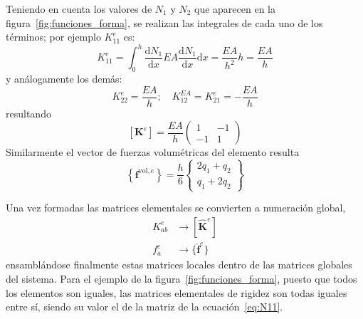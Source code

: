 \documentclass[spanish,a4paper,12pt]{article}
\begin{document}
Teniendo en cuenta los valores de $N_1$ y $N_2$ que aparecen en la figura~\ref{fig:funciones_forma}, se realizan las integrales de cada uno de los términos; por ejemplo $K_{11}^{e}$ es:
\begin{equation}\label{eq:N9}
K_{11}^{e}=\int_{0}^{h} \frac{\mathrm{d} N_{1}}{\mathrm{d} x} EA \frac{\mathrm{d} N_{1}}{\mathrm{d} x} \mathrm{d} x=\frac{EA}{h^{2}} h=\frac{EA}{h}
\end{equation}
y análogamente los demás:
\begin{equation}\label{eq:N10}
K_{22}^{e}=\frac{EA}{h} ; \quad K_{12}^{EA}=K_{21}^{e}=-\frac{EA}{h}
\end{equation}
resultando
\begin{equation}\label{eq:N11}
\left[\mathbf{K}^{e}\right]=\frac{EA}{h}\left(\begin{array}{cc}{1} & {-1} \\ {-1} & {1}\end{array}\right)
\end{equation}
Similarmente el vector de fuerzas volumétricas del elemento resulta
\begin{equation}\label{eq:N12}
\left\{\mathbf{f}^{\mathrm{vol}, e}\right\}=\frac{h}{6}\left\{\begin{array}{l}{2q_1+q_2} \\ {q_1 + 2q_2}\end{array}\right\}
\end{equation}


Una vez formadas las matrices elementales se convierten a
numeración global,
\begin{eqnarray}
K_{a b}^{e} & \rightarrow\left[\hat{\mathbf{K}}^{e}\right] \nonumber
 \\
f_{a}^{e} & \rightarrow \lbrace\hat{\mathbf{f}}^{e}\rbrace \nonumber
\end{eqnarray}
ensamblándose finalmente estas matrices locales dentro de las matrices globales del sistema. Para el ejemplo de la figura~\ref{fig:funciones_forma}, puesto que todos los elementos son iguales, las matrices elementales de rigidez son todas iguales entre sí, siendo su valor el de la matriz de la ecuación~\eqref{eq:N11}.
\end{document}
